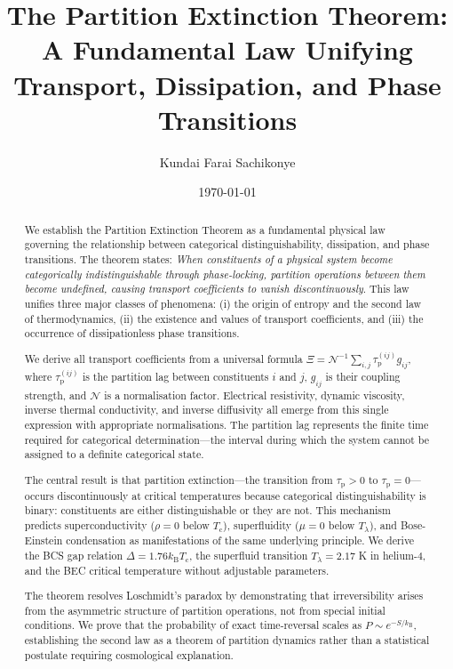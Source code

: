 \documentclass[twocolumn,10pt,aps,prd,superscriptaddress,nofootinbib]{revtex4-2}
\theoremstyle{remark}
\newcommand{\kB}{k_{\mathrm{B}}}
\newcommand{\tauP}{\tau_{\mathrm{p}}}
\newcommand{\Tcrit}{T_{\mathrm{c}}}
\newcommand{\Gij}{g_{ij}}
\newcommand{\Norm}{\mathcal{N}}
\newcommand{\Transp}{\Xi}
\begin{document}
\title{The Partition Extinction Theorem: A Fundamental Law Unifying Transport, Dissipation, and Phase Transitions}

\author{Kundai Farai Sachikonye}

\date{\today}

\begin{abstract}
We establish the Partition Extinction Theorem as a fundamental physical law governing the relationship between categorical distinguishability, dissipation, and phase transitions. The theorem states: \emph{When constituents of a physical system become categorically indistinguishable through phase-locking, partition operations between them become undefined, causing transport coefficients to vanish discontinuously}. This law unifies three major classes of phenomena: (i) the origin of entropy and the second law of thermodynamics, (ii) the existence and values of transport coefficients, and (iii) the occurrence of dissipationless phase transitions.

We derive all transport coefficients from a universal formula $\Transp = \Norm^{-1} \sum_{i,j} \tauP^{(ij)} \Gij$, where $\tauP^{(ij)}$ is the partition lag between constituents $i$ and $j$, $\Gij$ is their coupling strength, and $\Norm$ is a normalisation factor. Electrical resistivity, dynamic viscosity, inverse thermal conductivity, and inverse diffusivity all emerge from this single expression with appropriate normalisations. The partition lag represents the finite time required for categorical determination---the interval during which the system cannot be assigned to a definite categorical state.

The central result is that partition extinction---the transition from $\tauP > 0$ to $\tauP = 0$---occurs discontinuously at critical temperatures because categorical distinguishability is binary: constituents are either distinguishable or they are not. This mechanism predicts superconductivity ($\rho = 0$ below $\Tcrit$), superfluidity ($\mu = 0$ below $T_\lambda$), and Bose-Einstein condensation as manifestations of the same underlying principle. We derive the BCS gap relation $\Delta = 1.76 \kB \Tcrit$, the superfluid transition $T_\lambda = 2.17$ K in helium-4, and the BEC critical temperature without adjustable parameters.

The theorem resolves Loschmidt's paradox by demonstrating that irreversibility arises from the asymmetric structure of partition operations, not from special initial conditions. We prove that the probability of exact time-reversal scales as $P \sim e^{-S/\kB}$, establishing the second law as a theorem of partition dynamics rather than a statistical postulate requiring cosmological explanation.


\end{abstract}
\end{document}
